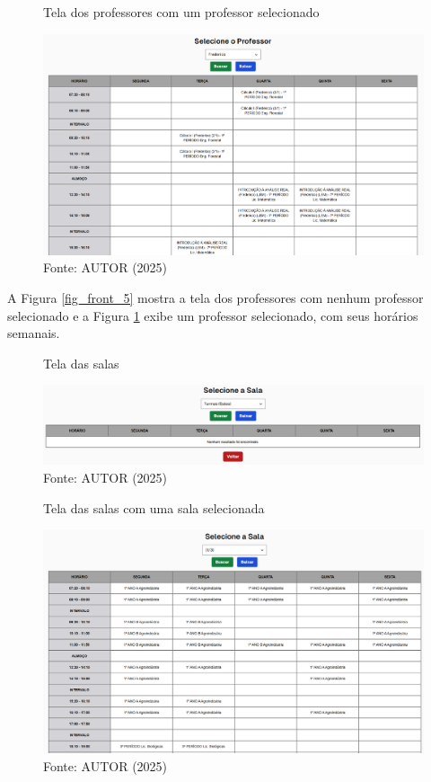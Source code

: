\begin{figure}[H]
    \centering
    \caption{Tela dos professores com um professor selecionado}
    \includegraphics[width=1\textwidth]{Figuras/front-6.png}
    \caption*{Fonte: AUTOR (2025)}
    \label{fig_front_6}
\end{figure}

A Figura \ref{fig_front_5} mostra a tela dos professores com nenhum professor selecionado e a Figura \ref{fig_front_6} exibe um professor selecionado, com seus horários semanais.

\begin{figure}[H]
    \centering
    \caption{Tela das salas}
    \includegraphics[width=1\textwidth]{Figuras/front-7.png}
    \caption*{Fonte: AUTOR (2025)}
    \label{fig_front_7}
\end{figure}

\begin{figure}[htb]
    \centering
    \caption{Tela das salas com uma sala selecionada}
    \includegraphics[width=1\textwidth]{Figuras/front-8.png}
    \caption*{Fonte: AUTOR (2025)}
    \label{fig_front_8}
\end{figure}

